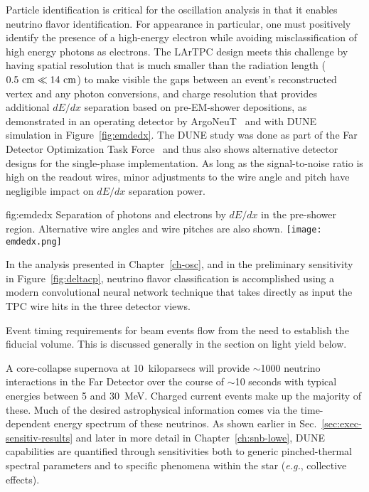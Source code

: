 Particle identification is critical for the oscillation analysis 
in that it enables neutrino flavor identification.  
For \nue{} appearance in particular, one
must positively identify the presence of a high-energy
electron while avoiding misclassification of high energy
photons as electrons. The LArTPC design meets this challenge
by having spatial resolution that is much smaller than the
radiation length ($0.5~\rm{cm} \ll 14~\rm{cm}$) to make
visible the gaps between an event's reconstructed vertex
and any photon conversions, and charge resolution that
provides additional $dE/dx$ separation based on pre-EM-shower
depositions, as demonstrated in an operating detector by
ArgoNeuT~\cite{argoneutdedx} and with DUNE simulation
in Figure~\ref{fig:emdedx}.  The DUNE study was done as
part of the Far Detector Optimization Task Force~\cite{fdtfreport}
and thus also shows alternative detector designs for the 
single-phase \lartpc implementation.  As long as
the signal-to-noise ratio is high on the readout wires,
minor adjustments to the wire angle and pitch have negligible
impact on $dE/dx$ separation power.
%
\begin{dunefigure}
{fig:emdedx}
{Separation of photons and electrons by $dE/dx$
in the pre-shower region.  Alternative wire angles and wire
pitches are also shown.}
  \texttt{[image: emdedx.png]}
\end{dunefigure}

In the analysis presented in Chapter~\ref{ch-osc}, and in
the preliminary  sensitivity in
Figure~\ref{fig:deltacp}, neutrino flavor classification
is accomplished using a modern convolutional neural network
technique that takes directly as input the TPC wire hits
in the three detector views.

Event timing requirements for beam events flow from the
need to establish the fiducial volume.  This is discussed
generally in the section on light yield below.

  A core-collapse
supernova at 10~kiloparsecs will provide $\sim$1000 neutrino
interactions in the Far Detector over the course of
$\sim$10 seconds with typical energies between 5 and 30~MeV.
Charged current \nue{} events make up the majority of these.
Much of the desired astrophysical information comes via the
time-dependent energy spectrum of these neutrinos.  As shown
earlier in Sec.~\ref{sec:exec-sensitiv-results} and later
in more detail in Chapter~\ref{ch:snb-lowe},
DUNE capabilities are quantified through sensitivities
both to generic pinched-thermal spectral parameters and to
specific phenomena within the star
({\em e.g.}, collective effects).

